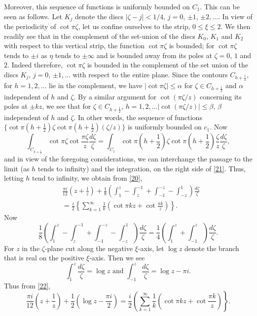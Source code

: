 Moreover, this sequence of functions is uniformly bounded on
$C_{1}$. This can be seen as follows. Let $K_{j}$ denote the discs
$|\zeta-j|<1/4$, $j=0$, $\pm 1$, $\pm 2,\ldots$. In view of the
periodicity of $\cot \pi \zeta$, let us confine ourselves to the
strip, $0\leq \xi\leq 2$. We then readily see that in the complement
of the set-union of the discs $K_{0}$, $K_{1}$ and $K_{2}$ with
respect to this vertical strip, the function $\cot \pi \zeta$ is
bounded; for $\cot\pi \zeta$ tends to $\pm i$ as $\eta$ tends to
$\pm\infty$ and is bounded away from its poles at $\zeta=0$, $1$ and
$2$. Indeed therefore, $\cot \pi \zeta$ is bounded in the complement
of the set union of the discs $K_{j}$, $j=0$, $\pm 1,\ldots$ with
respect to the entire plane. Since the contours $C_{h+\frac{1}{2}}$,
for $h=1,2,\ldots$ lie in the complement, we have $|\cot \pi
\zeta|\leq \alpha$ for $\zeta\in C_{h+\frac{1}{2}}$ and $\alpha$
independent of $h$ and $\zeta$. By a similar argument for $\cot(\pi
\zeta/z)$ concerning its poles at $\pm kz$, we see that for $\zeta\in
C_{h+\frac{1}{2}}$, $h=1,2,\ldots|\cot(\pi \zeta/z)|\leq \beta$,
$\beta$ independent of $h$ and $\zeta$. In other words, the sequence
of functions $\{\cot \pi(h+\frac{1}{2})\zeta\cot
\pi(h+\frac{1}{2})(\zeta/z)\}$ is uniformly bounded on $c_{1}$. Now
\begin{equation*}
\int_{C_{h+\frac{1}{2}}}\cot \pi\zeta\cot \frac{\pi
  \zeta}{z}\frac{d\zeta}{\zeta}=\int_{C_{1}}\cot\pi\left(h+\frac{1}{2}\right)\zeta\cot\pi\left(h+\frac{1}{2}\right)\frac{\zeta}{z}\frac{d\zeta}{\zeta},\tag{21}\label{21} 
\end{equation*}
and in view of the foregoing considerations, we can interchange the
passage to the limit (as $h$ tends to infinity) and the integration,
on the right side of \eqref{21}. Thus, letting $h$ tend to infinity,
we obtain from \eqref{20},
\begin{align*}
& \frac{\pi
  i}{12}\left(z+\frac{1}{z}\right)+\frac{1}{8}\left(\int^{z}_{1}-\int^{-1}_{z}+\int^{-z}_{-1}-\int^{1}_{-z}\right)\frac{d\zeta}{\zeta}\\
& =\frac{i}{2}\left\{\sum^{\infty}_{k=1}\frac{1}{k}\left(\cot\pi
  kz+\cot\frac{\pi k}{z}\right)\right\}.\tag{22}\label{22}
\end{align*}\pageoriginale
Now
$$
\frac{1}{8}\left(\int^{z}_{1}-\int^{-1}_{z}+\int^{-z}_{-1}-\int^{1}_{-z}\right)\frac{d\zeta}{\zeta}=\frac{1}{4}\left(\int^{z}_{1}+\int^{z}_{-1}\right)\frac{d\zeta}{\zeta}. 
$$
For $z$ in the $\zeta$-plane cut along the negative $\xi$-axis, let
$\log z$ denote the branch that is real on the positive
$\xi$-axis. Then we see
$$
\int^{z}_{1}\frac{d\zeta}{\zeta}=\log z\text{ \ and \ }
\int^{z}_{-1}\frac{d\zeta}{\zeta}=\log z-\pi i.
$$
Thus from \eqref{22},
\begin{equation*}
\frac{\pi i}{12}\left(z+\frac{1}{z}\right)+\frac{1}{2}\left(\log
z-\frac{\pi
  i}{2}\right)=\frac{i}{2}\left(\sum^{\infty}_{k=1}\frac{1}{k}\left(\cot
\pi kz+\cot \frac{\pi k}{z}\right)\right\}.\tag{23}\label{23}
\end{equation*}

